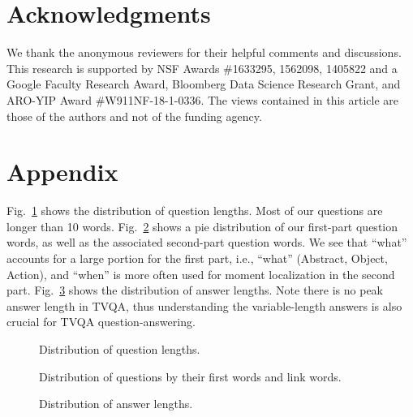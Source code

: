 \documentclass[11pt,a4paper]{article}
\begin{document}
\section*{Acknowledgments}

We thank the anonymous reviewers for their helpful comments and discussions.
This research is supported by NSF Awards \#1633295, 1562098, 1405822 and a Google Faculty Research Award, Bloomberg Data Science Research Grant, and ARO-YIP Award \#W911NF-18-1-0336.
The views contained in this article are those of the authors and not of the funding agency. \appendix
\section{Appendix}
\label{sec:supplemental}

\smallskip
{}

Fig.~\ref{fig:q_len_dist} shows the distribution of question lengths. Most of our questions are longer than 10 words. Fig.~\ref{fig:qtype_circle} shows a pie distribution of our first-part question words, as well as the associated second-part question words.
We see that ``what'' accounts for a large portion for the first part, i.e., ``what'' (Abstract, Object, Action), and ``when'' is more often used for moment localization in the second part.
Fig.~\ref{fig:ans_len_dist} shows the distribution of answer lengths. 
Note there is no peak answer length in TVQA, thus understanding the variable-length answers is also crucial for TVQA question-answering.


\begin{figure}[h]
\centering
{}
\vspace{-10pt}
  \caption{Distribution of question lengths.}
  \label{fig:q_len_dist}
 \vspace{-1pt}
\end{figure}


\begin{figure}[h]
\centering
{}
\vspace{-7pt}
  \caption{Distribution of questions by their first words and link words.}
  \label{fig:qtype_circle}
  \vspace{-1pt}
\end{figure}


\begin{figure}[ht!]
\centering
{}
\vspace{-10pt}
  \caption{Distribution of answer lengths.}
  \label{fig:ans_len_dist}
\end{figure}
\end{document}
